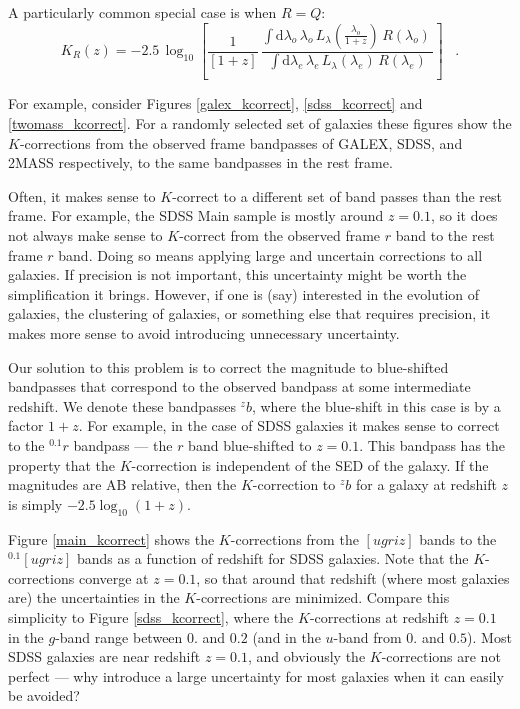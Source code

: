 \documentclass[10pt,preprint]{aastex}
\newcommand{\band}[2]{\ensuremath{^{{#1}}\!{#2}}}
\newcommand{\lambdaobs}{\lambda_o}
\newcommand{\lambdaemit}{\lambda_e}
\begin{document}
A particularly common special case is when $R=Q$:
\begin{equation}
\label{eq:specialL}
K_R(z) = -2.5\,\log_{10}\left[\frac{1}{[1+z]}\,
  \frac{\displaystyle
  \int\mathrm{d}\lambdaobs\,\lambdaobs\,L_{\lambda}\!\left(\frac{\lambdaobs}{1+z}\right)\,R(\lambdaobs)\,}
       {\displaystyle
    \int\mathrm{d}\lambdaemit\,\lambdaemit\,
    L_{\lambda}(\lambdaemit)\,R(\lambdaemit)}
\right] \;\;\;.
\end{equation}

For example, consider Figures \ref{galex_kcorrect},
\ref{sdss_kcorrect} and \ref{twomass_kcorrect}. For a randomly
selected set of galaxies these figures show the $K$-corrections from
the observed frame bandpasses of GALEX, SDSS, and 2MASS respectively,
to the same bandpasses in the rest frame.

Often, it makes sense to $K$-correct to a different set of band passes
than the rest frame. For example, the SDSS Main sample is mostly
around $z=0.1$, so it does not always make sense to $K$-correct from
the observed frame $r$ band to the rest frame $r$ band. Doing so means
applying large and uncertain corrections to all galaxies. If precision
is not important, this uncertainty might be worth the simplification
it brings. However, if one is (say) interested in the evolution of
galaxies, the clustering of galaxies, or something else that requires
precision, it makes more sense to avoid introducing unnecessary
uncertainty.

Our solution to this problem is to correct the magnitude to
blue-shifted bandpasses that correspond to the observed bandpass at
some intermediate redshift. We denote these bandpasses \band{z}{b},
where the blue-shift in this case is by a factor $1+z$. For example,
in the case of SDSS galaxies it makes sense to correct to the
\band{0.1}{r} bandpass --- the $r$ band blue-shifted to $z=0.1$. This
bandpass has the property that the $K$-correction is independent of
the SED of the galaxy. If the magnitudes are AB relative, then the
$K$-correction to \band{z}{b} for a galaxy at redshift $z$ is simply
$-2.5\log_{10} (1+z)$.

Figure \ref{main_kcorrect} shows the $K$-corrections from the
$[ugriz]$ bands to the $\band{0.1}{[ugriz]}$ bands as a function of
redshift for SDSS galaxies. Note that the $K$-corrections converge at
$z=0.1$, so that around that redshift (where most galaxies are) the
uncertainties in the $K$-corrections are minimized. Compare this
simplicity to Figure \ref{sdss_kcorrect}, where the $K$-corrections at
redshift $z=0.1$ in the $g$-band range between $0.$ and $0.2$ (and in
the $u$-band from $0.$ and $0.5$). Most SDSS galaxies are near
redshift $z=0.1$, and obviously the $K$-corrections are not perfect
--- why introduce a large uncertainty for most galaxies when it can
easily be avoided?
\end{document}
